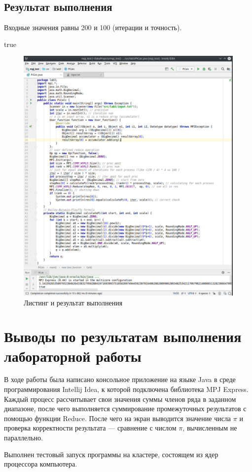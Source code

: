 \documentclass[titlepage,oneside,final,14pt]{extarticle} %
\begin{document}
\subsection{Результат выполнения}

Входные значения равны 200 и 100 (итерации и точность).

\ttfamily\small
{}

true

\normalfont\normalsize

\begin{figure}[H]
	\includegraphics[width=0.9\linewidth]{code_listing_results}
	\centering
	\caption{Листинг и результат выполнения}
\end{figure}

\section{Выводы по результатам выполнения лабораторной работы}

В ходе работы была написано консольное приложение на языке Java в среде программирования Intellij Idea, к которой подключена библиотека MPJ Express. Каждый процесс
рассчитывает свои значения суммы членов ряда в заданном диапазоне, после чего выполняется суммирование промежуточных результатов с помощью функции Reduce. После чего на экран выводится значение числа $\pi$ и проверка корректности результата --- сравнение с числом $\pi$, вычисленным не параллельно.

Выполнен тестовый запуск программы на кластере, состоящем из ядер процессора компьютера.
\end{document}
